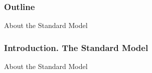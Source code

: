 \begin{frame}\frametitle{Outline}
\scriptsize
About the Standard Model
\end{frame}%

\begin{frame}\frametitle{Introduction. The Standard Model}
\scriptsize
About the Standard Model
\end{frame}%

